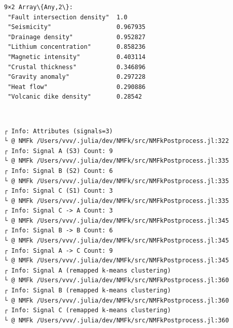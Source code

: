 \documentclass[11pt]{article}
\begin{document}
    
    
    \begin{Verbatim}[commandchars=\\\{\}]
9×2 Array\{Any,2\}:
 "Fault intersection density"  1.0
 "Seismicity"                  0.967935
 "Drainage density"            0.952827
 "Lithium concentration"       0.858236
 "Magnetic intensity"          0.403114
 "Crustal thickness"           0.346896
 "Gravity anomaly"             0.297228
 "Heat flow"                   0.290886
 "Volcanic dike density"       0.28542
    \end{Verbatim}

    
    \begin{center}
    \end{center}
    { \hspace*{\fill} \\}
    
    \begin{Verbatim}[commandchars=\\\{\}]
┌ Info: Attributes (signals=3)
└ @ NMFk /Users/vvv/.julia/dev/NMFk/src/NMFkPostprocess.jl:322
┌ Info: Signal A (S3) Count: 9
└ @ NMFk /Users/vvv/.julia/dev/NMFk/src/NMFkPostprocess.jl:335
┌ Info: Signal B (S2) Count: 6
└ @ NMFk /Users/vvv/.julia/dev/NMFk/src/NMFkPostprocess.jl:335
┌ Info: Signal C (S1) Count: 3
└ @ NMFk /Users/vvv/.julia/dev/NMFk/src/NMFkPostprocess.jl:335
┌ Info: Signal C -> A Count: 3
└ @ NMFk /Users/vvv/.julia/dev/NMFk/src/NMFkPostprocess.jl:345
┌ Info: Signal B -> B Count: 6
└ @ NMFk /Users/vvv/.julia/dev/NMFk/src/NMFkPostprocess.jl:345
┌ Info: Signal A -> C Count: 9
└ @ NMFk /Users/vvv/.julia/dev/NMFk/src/NMFkPostprocess.jl:345
┌ Info: Signal A (remapped k-means clustering)
└ @ NMFk /Users/vvv/.julia/dev/NMFk/src/NMFkPostprocess.jl:360
┌ Info: Signal B (remapped k-means clustering)
└ @ NMFk /Users/vvv/.julia/dev/NMFk/src/NMFkPostprocess.jl:360
┌ Info: Signal C (remapped k-means clustering)
└ @ NMFk /Users/vvv/.julia/dev/NMFk/src/NMFkPostprocess.jl:360
    \end{Verbatim}

    \begin{center}
    \end{center}
    { \hspace*{\fill} \\}
    
    \begin{Verbatim}[commandchars=\\\{\}]

    \end{Verbatim}
\end{document}
